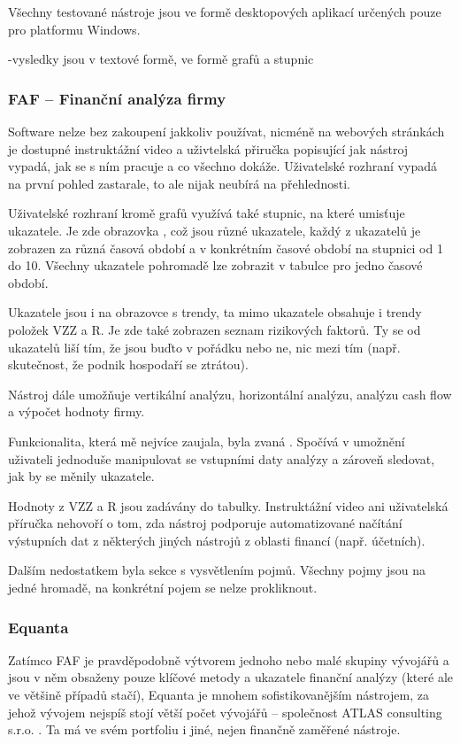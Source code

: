 Všechny testované nástroje jsou ve formě desktopových aplikací určených pouze pro platformu Windows.

-vysledky jsou v textové formě, ve formě grafů a stupnic

\subsubsection{FAF -- Finanční analýza firmy}
Software nelze bez zakoupení jakkoliv používat, nicméně na webových stránkách je dostupné instruktážní video a uživtelská přiručka popisující jak nástroj vypadá, jak se s ním pracuje a co všechno dokáže. Uživatelské rozhraní vypadá na první pohled zastarale, to ale nijak neubírá na přehlednosti.

Uživatelské rozhraní kromě grafů využívá také stupnic, na které umisťuje ukazatele. Je zde obrazovka , což jsou různé ukazatele, každý z ukazatelů je zobrazen za různá časová období a v konkrétním časové období na stupnici od 1 do 10. Všechny ukazatele pohromadě lze zobrazit v tabulce pro jedno časové období.

Ukazatele jsou i na obrazovce s trendy, ta mimo ukazatele obsahuje i trendy položek VZZ a R. Je zde také zobrazen seznam rizikových faktorů. Ty se od ukazatelů liší tím, že jsou buďto v pořádku nebo ne, nic mezi tím (např. skutečnost, že podnik hospodaří se ztrátou).

Nástroj dále umožňuje vertikální analýzu, horizontální analýzu, analýzu cash flow a výpočet hodnoty firmy.

Funkcionalita, která mě nejvíce zaujala, byla zvaná . Spočívá v umožnění uživateli jednoduše manipulovat se vstupními daty analýzy a zároveň sledovat, jak by se měnily ukazatele.

Hodnoty z VZZ a R jsou zadávány do tabulky. Instruktážní video ani uživatelská příručka nehovoří o tom, zda nástroj podporuje automatizované načítání výstupních dat z některých jiných nástrojů z oblasti financí (např. účetních).

Dalším nedostatkem byla sekce s vysvětlením pojmů. Všechny pojmy jsou na jedné hromadě, na konkrétní pojem se nelze prokliknout.


\subsubsection{Equanta}
Zatímco FAF je pravděpodobně výtvorem jednoho nebo malé skupiny vývojářů a jsou v něm obsaženy pouze klíčové metody a ukazatele finanční analýzy (které ale ve většině případů stačí), Equanta je mnohem sofistikovanějším nástrojem, za jehož vývojem nejspíš stojí větší počet vývojářů -- společnost ATLAS consulting s.r.o. . Ta má ve svém portfoliu i jiné, nejen finančně zaměřené nástroje.


